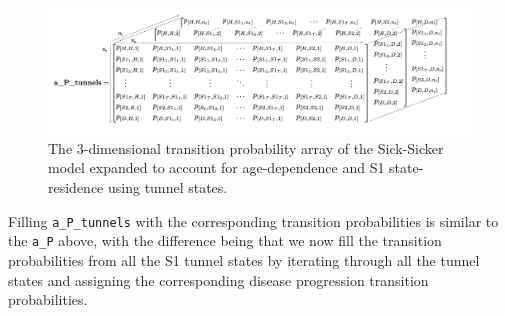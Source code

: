 \documentclass[
]{article}
\begin{document}
\begin{figure}[H]

{\centering \includegraphics[width=1\linewidth]{figs/3D-state-transition-array-sick-sicker-tunnels} 

}

\caption{The 3-dimensional transition probability array of the Sick-Sicker model expanded to account for age-dependence and S1 state-residence using tunnel states.}\label{fig:Array-Time-Dependent-Tunnels}
\end{figure}

Filling \texttt{a\_P\_tunnels} with the corresponding transition probabilities is similar to the \texttt{a\_P} above, with the difference being that we now fill the transition probabilities from all the S1 tunnel states by iterating through all the tunnel states and assigning the corresponding disease progression transition probabilities.
\end{document}
